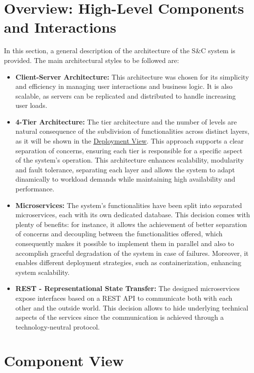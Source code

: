 \section{Overview: High-Level Components and Interactions}
\label{sec: overview}
In this section, a general description of the architecture of the S\&C system is provided.
The main architectural styles to be followed are:
\begin{itemize}
    \item \textbf{Client-Server Architecture:} This architecture was chosen for its simplicity and efficiency in managing user interactions and business logic. It is also scalable, as servers can be replicated and distributed to handle increasing user loads.
    \item \textbf{4-Tier Architecture:} The tier architecture and the number of levels are natural consequence of the subdivision of functionalities across distinct layers, as it will be shown in the \hyperref[sec: deployment_view]{\uline{Deployment View}}. This approach supports a clear separation of concerns, ensuring each tier is responsible for a specific aspect of the system’s operation. This architecture enhances scalability, modularity and fault tolerance, separating each layer and allows the system to adapt dinamically to workload demands while maintaining high availability and performance.
    \item \textbf{Microservices:} The system's functionalities have been split into separated microservices, each with its own dedicated database. This decision comes with plenty of benefits: for instance, it allows the achievement of better separation of concerns and decoupling between the functionalities offered, which consequently makes it possible to implement them in parallel and also to accomplish graceful degradation of the system in case of failures. Moreover, it enables different deployment strategies, such as containerization, enhancing system scalability.
    \item \textbf{REST - Representational State Transfer:} The designed microservices expose interfaces based on a REST API to communicate both with each other and the outside world. This decision allows to hide underlying technical aspects of the services since the communication is achieved through a technology-neutral protocol.
\end{itemize}

\newpage

\section{Component View}
\label{sec: component_view}

